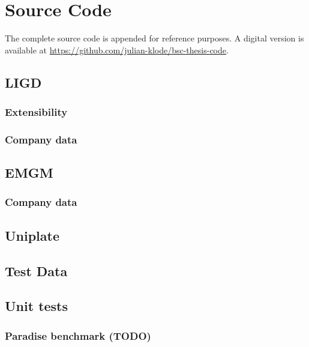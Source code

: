 \chapter{Source Code}

The complete source code is appended for reference purposes. A digital version
is available at \url{https://github.com/julian-klode/bsc-thesis-code}.

\lstset{frame=none}
\section{LIGD}

\subsection{Extensibility}

\subsection{Company data}

\section{EMGM}

\subsection{Company data}

\section{Uniplate}

\section{Test Data}

\section{Unit tests}
\subsection{Paradise benchmark (TODO)}

